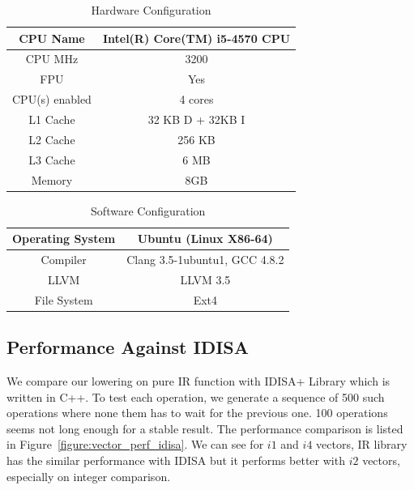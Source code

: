 \begin{table}[h]
\centering
\begin{tabular}{|c|c|}
\hline
CPU Name       & Intel(R) Core(TM) i5-4570 CPU \\ \hline
CPU MHz        & 3200                          \\ \hline
FPU            & Yes                           \\ \hline
CPU(s) enabled & 4 cores                       \\ \hline
L1 Cache       & 32 KB D + 32KB I              \\ \hline
L2 Cache       & 256 KB                        \\ \hline
L3 Cache       & 6 MB                          \\ \hline
Memory         & 8GB                           \\ \hline
\end{tabular}
\caption{Hardware Configuration}
\label{table:hardware_config}
\end{table}

\begin{table}[h]
\centering
\begin{tabular}{|c|c|}
\hline
Operating System & Ubuntu (Linux X86-64)         \\ \hline
Compiler         & Clang 3.5-1ubuntu1, GCC 4.8.2 \\ \hline
LLVM             & LLVM 3.5                      \\ \hline
File System      & Ext4                          \\ \hline
\end{tabular}
\caption{Software Configuration}
\label{table:software_config}
\end{table}

\subsection{Performance Against IDISA}
We compare our lowering on pure IR function with IDISA+ Library \cite{hua_idisa} which is written in C++. To test each operation, we generate a sequence of 500 such operations where none them has to wait for the previous one. 100 operations seems not long enough for a stable result. The performance comparison is listed in Figure~\ref{figure:vector_perf_idisa}. We can see for $i1$ and $i4$ vectors, IR library has the similar performance with IDISA but it performs better with $i2$ vectors, especially on integer comparison.

